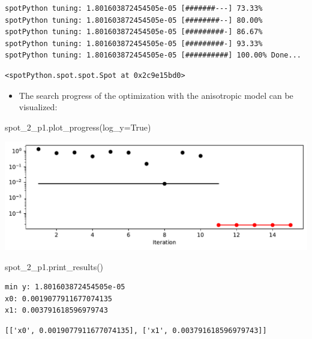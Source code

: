 \documentclass[
  letterpaper,
  DIV=11,
  numbers=noendperiod]{scrreprt}
\newenvironment{Shaded}{\begin{snugshade}}{\end{snugshade}}
\newcommand{\NormalTok}[1]{\textcolor[rgb]{0.00,0.23,0.31}{#1}}
\newcommand{\OperatorTok}[1]{\textcolor[rgb]{0.37,0.37,0.37}{#1}}
\newcommand{\VariableTok}[1]{\textcolor[rgb]{0.07,0.07,0.07}{#1}}
\providecommand{\tightlist}{%
  \setlength{\itemsep}{0pt}\setlength{\parskip}{0pt}}\usepackage{longtable,booktabs,array}
\begin{document}
\begin{verbatim}
spotPython tuning: 1.801603872454505e-05 [#######---] 73.33% 
spotPython tuning: 1.801603872454505e-05 [########--] 80.00% 
spotPython tuning: 1.801603872454505e-05 [#########-] 86.67% 
spotPython tuning: 1.801603872454505e-05 [#########-] 93.33% 
spotPython tuning: 1.801603872454505e-05 [##########] 100.00% Done...
\end{verbatim}

\begin{verbatim}
<spotPython.spot.spot.Spot at 0x2c9e15bd0>
\end{verbatim}

\begin{itemize}
\tightlist
\item
  The search progress of the optimization with the anisotropic model can
  be visualized:
\end{itemize}

\begin{Shaded}
\begin{Highlighting}[]
\NormalTok{spot\_2\_p1.plot\_progress(log\_y}\OperatorTok{=}\VariableTok{True}\NormalTok{)}
\end{Highlighting}
\end{Shaded}

\includegraphics{015_num_spot_correlation_p_files/figure-pdf/cell-10-output-1.pdf}

\begin{Shaded}
\begin{Highlighting}[]
\NormalTok{spot\_2\_p1.print\_results()}
\end{Highlighting}
\end{Shaded}

\begin{verbatim}
min y: 1.801603872454505e-05
x0: 0.0019077911677074135
x1: 0.003791618596979743
\end{verbatim}

\begin{verbatim}
[['x0', 0.0019077911677074135], ['x1', 0.003791618596979743]]
\end{verbatim}
\end{document}
